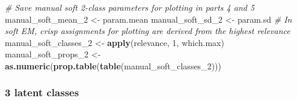 \documentclass[
]{article}
\newenvironment{Shaded}{\begin{snugshade}}{\end{snugshade}}
\newcommand{\CommentTok}[1]{\textcolor[rgb]{0.56,0.35,0.01}{\textit{#1}}}
\newcommand{\DecValTok}[1]{\textcolor[rgb]{0.00,0.00,0.81}{#1}}
\newcommand{\FunctionTok}[1]{\textcolor[rgb]{0.13,0.29,0.53}{\textbf{#1}}}
\newcommand{\NormalTok}[1]{#1}
\newcommand{\OtherTok}[1]{\textcolor[rgb]{0.56,0.35,0.01}{#1}}
\begin{document}
\begin{Shaded}
\begin{Highlighting}[]
\CommentTok{\# Save manual soft 2{-}class parameters for plotting in parts 4 and 5}
\NormalTok{manual\_soft\_mean\_2 }\OtherTok{\textless{}{-}}\NormalTok{ param.mean}
\NormalTok{manual\_soft\_sd\_2 }\OtherTok{\textless{}{-}}\NormalTok{ param.sd}
\CommentTok{\# In soft EM, crisp assignments for plotting are derived from the highest relevance}
\NormalTok{manual\_soft\_classes\_2 }\OtherTok{\textless{}{-}} \FunctionTok{apply}\NormalTok{(relevance, }\DecValTok{1}\NormalTok{, which.max) }
\NormalTok{manual\_soft\_props\_2 }\OtherTok{\textless{}{-}} \FunctionTok{as.numeric}\NormalTok{(}\FunctionTok{prop.table}\NormalTok{(}\FunctionTok{table}\NormalTok{(manual\_soft\_classes\_2)))}
\end{Highlighting}
\end{Shaded}

\subsubsection{3 latent classes}\label{latent-classes-1}
\end{document}
